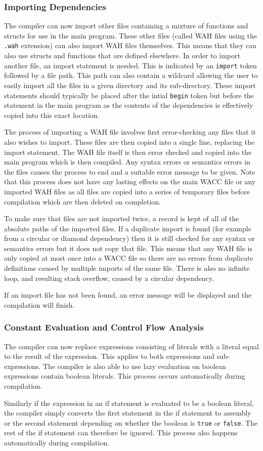 \documentclass[]{article}
\begin{document}
\subsubsection{Importing Dependencies} { The compiler can now import other files containing a mixture of functions and structs for use in the main program. These other files (called WAH files using the {\tt .wah} extension) can also import WAH files themselves. This means that they can also use structs and functions that are defined elsewhere. In order to import another file, an import statement is needed. This is indicated by an {\tt import} token followed by a file path. This path can also contain a wildcard allowing the user to easily import all the files in a given directory and its sub-directory. These import statements should typically be placed after the intial {\tt begin} token but before the statement in the main program as the contents of the dependencies is effectively copied into this exact location.

The process of importing a WAH file involves first error-checking any files that it also wishes to import. These files are then copied into a single line, replacing the import statement. The WAH file itself is then error checked and copied into the main program which is then compiled. Any syntax errors or semantics errors in the files causes the process to end and a suitable error message to be given. Note that this process does not have any lasting effects on the main WACC file or any imported WAH files as all files are copied into a series of temporary files before compilation which are then deleted on completion.

To make sure that files are not imported twice, a record is kept of all of the absolute paths of the imported files. If a duplicate import is found (for example from a circular or diamond dependency) then it is still checked for any syntax or semantics errors but it does not copy that file. This means that any WAH file is only copied at most once into a WACC file so there are no errors from duplicate definitions caused by multiple imports of the same file. There is also no infinite loop, and resulting stack overflow, caused by a circular dependency.

If an import file has not been found, an error message will be displayed and the compilation will finish. }
\subsubsection{Constant Evaluation and Control Flow Analysis} { The compiler can now replace expressions consisting of literals with a literal equal to the result of the expression. This applies to both expressions and sub-expressions. The compiler is also able to use lazy evaluation on boolean expressions contain boolean literals. This process occurs automatically during compilation.

Similarly if the expression in an if statement is evaluated to be a boolean literal, the compiler simply converts the first statement in the if statement to assembly or the second statement depending on whether the boolean is {\tt true} or {\tt false}. The rest of the if statement can therefore be ignored. This process also happens automatically during compilation. }
\end{document}

